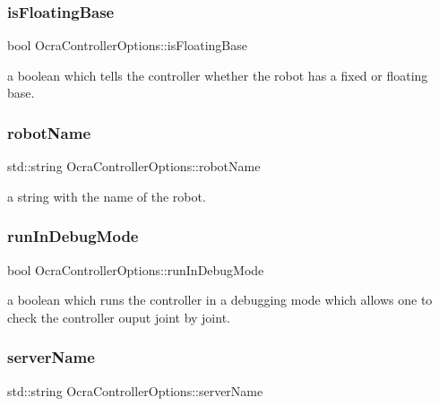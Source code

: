 \subsubsection{\texorpdfstring{is\+Floating\+Base}{isFloatingBase}}
{\footnotesize\ttfamily bool Ocra\+Controller\+Options\+::is\+Floating\+Base}

a boolean which tells the controller whether the robot has a fixed or floating base. \hypertarget{classOcraControllerOptions_a897948011f23b08ba20e1707033458d4}{}\label{classOcraControllerOptions_a897948011f23b08ba20e1707033458d4} 
\subsubsection{\texorpdfstring{robot\+Name}{robotName}}
{\footnotesize\ttfamily std\+::string Ocra\+Controller\+Options\+::robot\+Name}

a string with the name of the robot. \hypertarget{classOcraControllerOptions_a26dce90c0e6cf7ba608020d01cd08f3c}{}\label{classOcraControllerOptions_a26dce90c0e6cf7ba608020d01cd08f3c} 
\subsubsection{\texorpdfstring{run\+In\+Debug\+Mode}{runInDebugMode}}
{\footnotesize\ttfamily bool Ocra\+Controller\+Options\+::run\+In\+Debug\+Mode}

a boolean which runs the controller in a debugging mode which allows one to check the controller ouput joint by joint. \hypertarget{classOcraControllerOptions_a22380b083fbf0b202993d0415d1d4c83}{}\label{classOcraControllerOptions_a22380b083fbf0b202993d0415d1d4c83} 
\subsubsection{\texorpdfstring{server\+Name}{serverName}}
{\footnotesize\ttfamily std\+::string Ocra\+Controller\+Options\+::server\+Name}

